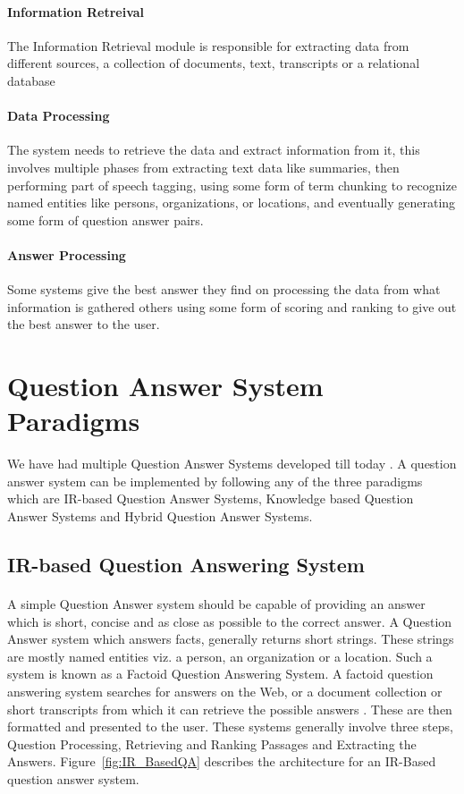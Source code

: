\paragraph{Information Retreival}
The Information Retrieval module is responsible for extracting data from different sources, a collection of documents, text, transcripts or a relational database

\paragraph{Data Processing}
The system needs to retrieve the data and extract information from it, this involves multiple phases from extracting text data like summaries, then performing part of speech tagging, using some form of term chunking to recognize named entities like persons, organizations, or locations, and eventually generating some form of question answer pairs.

\paragraph{Answer Processing}
Some systems give the best answer they find on processing the data from what information is gathered others using some form of scoring and ranking to give out the best answer to the user.

\section{Question Answer System Paradigms}
We have had multiple Question Answer Systems developed till today \cite {katz1997annotating} \cite {zheng2002answerbus}.
A question answer system can be implemented by following any of the three paradigms \cite {wongso2016literature} which are IR-based Question Answer Systems, Knowledge based Question Answer Systems and Hybrid Question Answer Systems.

\subsection{IR-based Question Answering System}
\paragraph{}
A simple Question Answer system should be capable of providing an answer which is short, concise and as close as possible to the correct answer. A Question Answer system which answers facts, generally returns short strings. These strings are mostly named entities viz. a person, an organization or a location. Such a system is known as a Factoid Question Answering System. A factoid question answering system searches for answers on the Web, or a document collection or short transcripts from which it can retrieve the possible answers \cite {chopra2016named}. These are then formatted and presented to the user. These systems generally involve three steps, Question Processing, Retrieving and Ranking Passages and Extracting the Answers. Figure~\ref{fig:IR_BasedQA} describes the architecture for an IR-Based question answer system.

